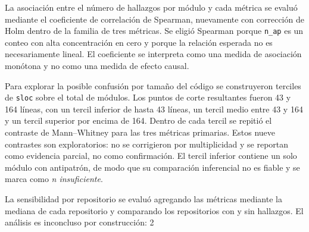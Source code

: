 La asociación entre el número de hallazgos por módulo y cada métrica se evaluó mediante el coeficiente de correlación de Spearman, nuevamente con corrección de Holm dentro de la familia de tres métricas. Se eligió Spearman porque \texttt{n\_ap} es un conteo con alta concentración en cero y porque la relación esperada no es necesariamente lineal. El coeficiente se interpreta como una medida de asociación monótona y no como una medida de efecto causal.

Para explorar la posible confusión por tamaño del código se construyeron terciles de \texttt{sloc} sobre el total de módulos. Los puntos de corte resultantes fueron 43 y 164 líneas, con un tercil inferior de hasta 43 líneas, un tercil medio entre 43 y 164 y un tercil superior por encima de 164. Dentro de cada tercil se repitió el contraste de Mann--Whitney para las tres métricas primarias. Estos nueve contrastes son exploratorios: no se corrigieron por multiplicidad y se reportan como evidencia parcial, no como confirmación. El tercil inferior contiene un solo módulo con antipatrón, de modo que su comparación inferencial no es fiable y se marca como \emph{n insuficiente}.

La sensibilidad por repositorio se evaluó agregando las métricas mediante la mediana de cada repositorio y comparando los repositorios con y sin hallazgos. El análisis es inconcluso por construcción: 2